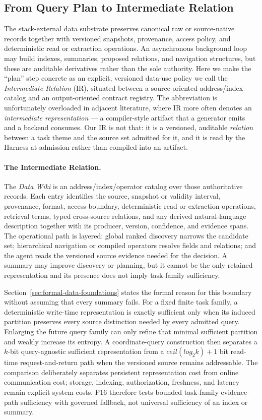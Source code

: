 \documentclass[11pt]{article}
\begin{document}
\subsection{From Query Plan to Intermediate Relation}
\label{sec:intermediate-relation}

The stack-external data substrate preserves canonical raw or source-native records together with versioned snapshots, provenance, access policy, and deterministic read or extraction operations. An asynchronous background loop may build indexes, summaries, proposed relations, and navigation structures, but these are auditable derivatives rather than the sole authority. Here we make the ``plan'' step concrete as an explicit, versioned data-use policy we call the \textit{Intermediate Relation} (IR), situated between a source-oriented address/index catalog and an output-oriented contract registry. The abbreviation is unfortunately overloaded in adjacent literature, where IR more often denotes an \textit{intermediate representation} --- a compiler-style artifact that a generator emits and a backend consumes. Our IR is not that: it is a versioned, auditable \textit{relation} between a task theme and the source set admitted for it, and it is read by the Harness at admission rather than compiled into an artifact.

\paragraph{The Intermediate Relation.}
The \textit{Data Wiki} is an address/index/operator catalog over those authoritative records. Each entry identifies the source, snapshot or validity interval, provenance, format, access boundary, deterministic read or extraction operations, retrieval terms, typed cross-source relations, and any derived natural-language description together with its producer, version, confidence, and evidence spans. The operational path is layered: global ranked discovery narrows the candidate set; hierarchical navigation or compiled operators resolve fields and relations; and the agent reads the versioned source evidence needed for the decision. A summary may improve discovery or planning, but it cannot be the only retained representation and its presence does not imply task-family sufficiency.

Section~\ref{sec:formal-data-foundations} states the formal reason for this boundary without assuming that every summary fails. For a fixed finite task family, a deterministic write-time representation is exactly sufficient only when its induced partition preserves every source distinction needed by every admitted query. Enlarging the future query family can only refine that minimal sufficient partition and weakly increase its entropy. A coordinate-query construction then separates a $k$-bit query-agnostic sufficient representation from a $ceil(log_2 k)+1$ bit read-time request-and-return path when the versioned source remains addressable. The comparison deliberately separates persistent representation cost from online communication cost; storage, indexing, authorization, freshness, and latency remain explicit system costs. P16 therefore tests bounded task-family evidence-path sufficiency with governed fallback, not universal sufficiency of an index or summary.
\end{document}
